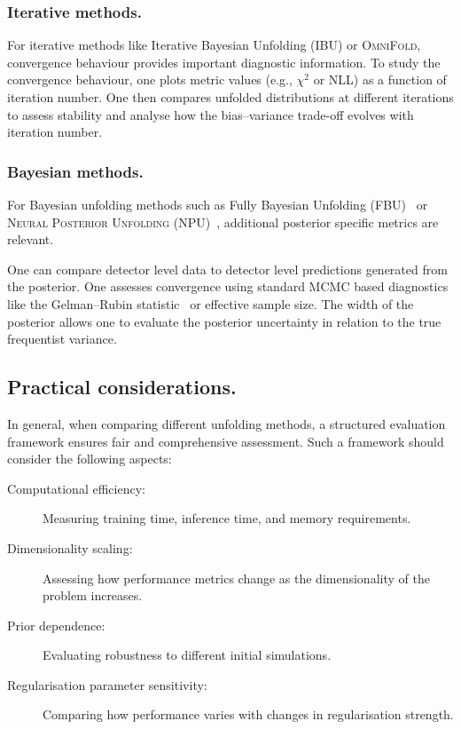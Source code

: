         \subsubsection{Iterative methods.}
            For iterative methods like Iterative Bayesian Unfolding (IBU) or \textsc{OmniFold}, convergence behaviour provides important diagnostic information.
        To study the convergence behaviour, one plots metric values (e.g., \(\chi^2\) or NLL) as a function of iteration number.
        One then compares unfolded distributions at different iterations to assess stability and analyse how the bias--variance trade-off evolves with iteration number.

        \subsubsection{Bayesian methods.}
            {
            For Bayesian unfolding methods such as Fully Bayesian Unfolding (FBU)~\cite{choudalakis_fully_2012} or \textsc{Neural Posterior Unfolding} (NPU)~\cite{acosta2024npu}, additional posterior specific metrics are relevant.\par}
            
            One can compare detector level data to detector level predictions generated from the posterior.
            One assesses convergence using standard MCMC based diagnostics like the Gelman--Rubin statistic~\cite{Gelman:1992zz} or effective sample size.
            The width of the posterior allows one to evaluate the posterior uncertainty in relation to the true frequentist variance.

    \subsection{Practical considerations.}
        In general, when comparing different unfolding methods, a structured evaluation framework ensures fair and comprehensive assessment. Such a framework should consider the following aspects:
        \begin{description}
            \item[Computational efficiency:] Measuring training time, inference time, and memory requirements.
            \item[Dimensionality scaling:] Assessing how performance metrics change as the dimensionality of the problem increases.
            \item[Prior dependence:] Evaluating robustness to different initial simulations.
            \item[Regularisation parameter sensitivity:] Comparing how performance varies with changes in regularisation strength.
        \end{description}

